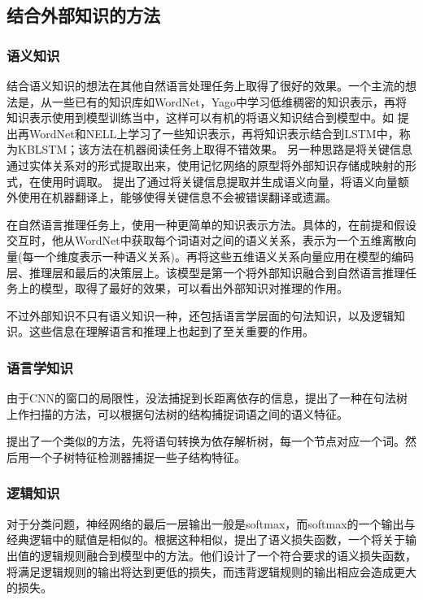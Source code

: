 \documentclass[UTF8,11pt,a4paper,nofonts]{ctexart}
\begin{document}
\subsection{结合外部知识的方法}

\subsubsection{语义知识}

结合语义知识的想法在其他自然语言处理任务上取得了很好的效果。一个主流的想法是，从一些已有的知识库如WordNet，Yago中学习低维稠密的知识表示，再将知识表示使用到模型训练当中，这样可以有机的将语义知识结合到模型中。如
\cite{}提出再WordNet和NELL上学习了一些知识表示，再将知识表示结合到LSTM中，称为KBLSTM；该方法在机器阅读任务上取得不错效果。
另一种思路是将关键信息通过实体关系对的形式提取出来，使用记忆网络的原型将外部知识存储成映射的形式，在使用时调取。
\cite{}提出了通过将关键信息提取并生成语义向量，将语义向量额外使用在机器翻译上，能够使得关键信息不会被错误翻译或遗漏。

在自然语言推理任务上，\cite{}使用一种更简单的知识表示方法。具体的，在前提和假设交互时，他从WordNet中获取每个词语对之间的语义关系，表示为一个五维离散向量(每一个维度表示一种语义关系)。再将这些五维语义关系向量应用在模型的编码层、推理层和最后的决策层上。该模型是第一个将外部知识融合到自然语言推理任务上的模型，取得了最好的效果，可以看出外部知识对推理的作用。

不过外部知识不只有语义知识一种，还包括语言学层面的句法知识，以及逻辑知识。这些信息在理解语言和推理上也起到了至关重要的作用。

\subsubsection{语言学知识}

由于CNN的窗口的局限性，没法捕捉到长距离依存的信息，\cite{}提出了一种在句法树上作扫描的方法，可以根据句法树的结构捕捉词语之间的语义特征。

\cite{}提出了一个类似的方法，先将语句转换为依存解析树，每一个节点对应一个词。然后用一个子树特征检测器捕捉一些子结构特征。

\subsubsection{逻辑知识}

对于分类问题，神经网络的最后一层输出一般是softmax，而softmax的一个输出与经典逻辑中的赋值是相似的。根据这种相似，\cite{}提出了语义损失函数，一个将关于输出值的逻辑规则融合到模型中的方法。他们设计了一个符合要求的语义损失函数，将满足逻辑规则的输出将达到更低的损失，而违背逻辑规则的输出相应会造成更大的损失。
\end{document}

